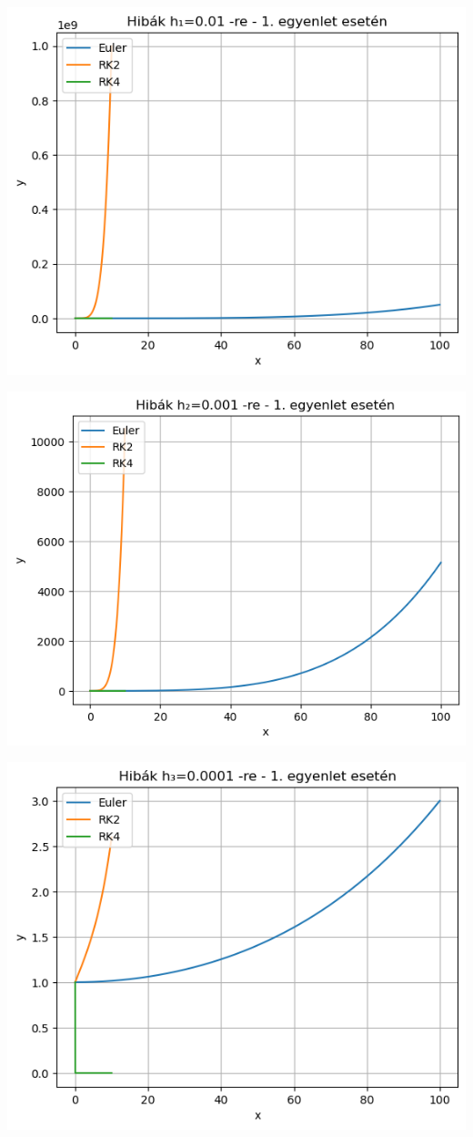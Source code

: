 \documentclass{article}
\begin{document}
\includegraphics[scale=1]{../plot_13.png} 

\includegraphics[scale=1]{../plot_14.png} 

\includegraphics[scale=1]{../plot_15.png} 
\end{document}
